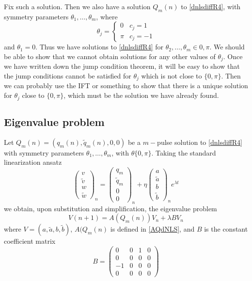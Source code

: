 \documentclass[12pt]{article}
\begin{document}
Fix such a solution. Then we also have a solution $Q_m(n)$ to \eqref{dnlsdiffR4}, with symmetry parameters $\theta_1, \dots, \theta_m$, where
\[
\theta_j = \begin{cases}
0 & c_j = 1 \\
\pi & c_j = -1
\end{cases}
\]
and $\theta_1 = 0$. Thus we have solutions to \eqref{dnlsdiffR4} for $\theta_2, \dots, \theta_m \in {0, \pi}$. We should be able to show that we cannot obtain solutions for any other values of $\theta_j$. Once we have written down the jump condition theorem, it will be easy to show that the jump conditions cannot be satisfied for $\theta_j$ which is not close to $\{0, \pi\}$. Then we can probably use the IFT or something to show that there is a unique solution for $\theta_j$ close to $\{0, \pi\}$, which must be the solution we have already found.

\subsection{Eigenvalue problem}

Let $Q_m(n) = (q_m(n), \tilde{q}_m(n), 0, 0)$ be a $m-$pulse solution to \eqref{dnlsdiffR4} with symmetry parameters $\theta_1, \dots, \theta_m$, with $\theta \{0, \pi\}$. Taking the standard linearization ansatz
\[
\begin{pmatrix}v \\ \tilde{v} \\ w \\ \tilde{w} \end{pmatrix}_n = 
\begin{pmatrix}q_m \\ \tilde{q}_m \\ 0 \\ 0 \end{pmatrix}_n + 
\eta \begin{pmatrix}a \\ \tilde{a} \\ b \\ \tilde{b} \end{pmatrix}_n e^{\lambda t}
\]
we obtain, upon substitution and simplification, the eigenvalue problem 
\begin{equation}\label{dNLSEVP}
V(n+1) = A(Q_m(n)) V_n + \lambda B V_n
\end{equation}
where $V = (a, \tilde{a}, b, \tilde{b})$, $A(Q_m(n)$ is defined in \eqref{AQdNLS}, and $B$ is the constant coefficient matrix 
\[
B = 
\begin{pmatrix}
0 & 0 & 1 & 0 \\
0 & 0 & 0 & 0 \\
-1 & 0 & 0 & 0 \\
0 & 0 & 0 & 0
\end{pmatrix}
\]
\end{document}
